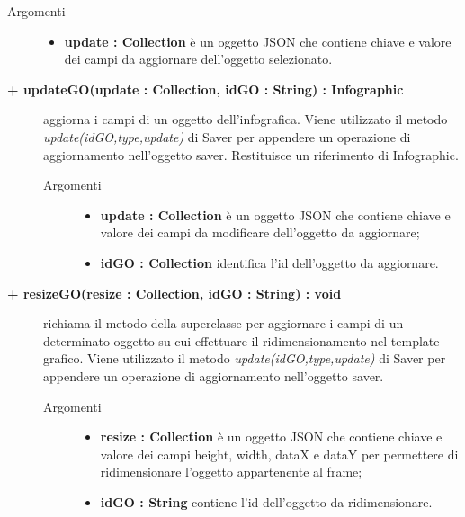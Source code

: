 \begin{description}
\begin{description}
\begin{description}
			\item[Argomenti] \hfill
				\begin{itemize}
						\item \textbf{update : Collection			} \hfill
					è un oggetto JSON che contiene chiave e valore dei campi da aggiornare dell'oggetto selezionato.
				\end{itemize}

\end{description}

\end{description}

\begin{description}
		\item[\textbf{\color{blue}+ updateGO(update : Collection, idGO : String) : Infographic			}] \hfill
			aggiorna i campi di un oggetto dell'infografica. Viene utilizzato il metodo \textit{update(idGO,type,update)} di Saver per appendere un operazione di aggiornamento nell'oggetto saver. Restituisce un riferimento di Infographic.   

\begin{description}
			\item[Argomenti] \hfill
				\begin{itemize}
						\item \textbf{update : Collection			} \hfill
					è un oggetto JSON che contiene chiave e valore dei campi da modificare dell'oggetto da aggiornare;
					\item \textbf{idGO : Collection			} \hfill
					identifica l'id dell'oggetto da aggiornare.
				\end{itemize}

\end{description}

\end{description}

\begin{description}
		\item[\textbf{\color{blue}+ resizeGO(resize : Collection, idGO : String) : void			}] \hfill
			richiama il metodo della superclasse per aggiornare i campi di un determinato oggetto su cui effettuare il ridimensionamento nel template grafico. Viene utilizzato il metodo \textit{update(idGO,type,update)} di Saver per appendere un operazione di aggiornamento nell'oggetto saver.     

\begin{description}
			\item[Argomenti] \hfill
				\begin{itemize}
					\item \textbf{resize : Collection			} \hfill
					è un oggetto JSON che contiene chiave e valore dei campi height, width, dataX e dataY per permettere di ridimensionare l'oggetto appartenente al frame;
					\item \textbf{idGO : String			} \hfill
					contiene l'id dell'oggetto da ridimensionare.
				\end{itemize}


\end{description}
\end{description}
\end{description}
